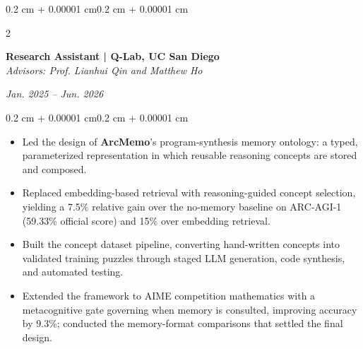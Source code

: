 \documentclass[10pt, letterpaper]{article}
\newenvironment{highlights}{
    \begin{itemize}[
        topsep=0.10 cm,
        parsep=0.10 cm,
        partopsep=0pt,
        itemsep=0pt,
        leftmargin=0.4 cm + 10pt
    ]
}{\end{itemize}}
\newenvironment{onecolentry}{
    \begin{adjustwidth}{0.2 cm + 0.00001 cm}{0.2 cm + 0.00001 cm}
}{\end{adjustwidth}}
\newenvironment{twocolentry}[2][]{
    \onecolentry
    \def\secondColumn{#2}
    \setcolumnwidth{\fill, 4.5 cm}
    \begin{paracol}{2}
}{
    \switchcolumn \raggedleft \secondColumn
    \end{paracol}
    \endonecolentry
}
\begin{document}
    \begin{twocolentry}{\textit{Jan. 2025 -- Jun. 2026}}
        \textbf{Research Assistant | Q-Lab, UC San Diego}\\
        \textit{Advisors: Prof. Lianhui Qin and Matthew Ho}
    \end{twocolentry}
    \vspace{0.10 cm}
    \begin{onecolentry}
        \begin{highlights}
            \item Led the design of \textbf{ArcMemo}'s program-synthesis memory ontology: a typed, parameterized representation in which reusable reasoning concepts are stored and composed.
            \item Replaced embedding-based retrieval with reasoning-guided concept selection, yielding a 7.5\% relative gain over the no-memory baseline on ARC-AGI-1 (59.33\% official score) and 15\% over embedding retrieval.
            \item Built the concept dataset pipeline, converting hand-written concepts into validated training puzzles through staged LLM generation, code synthesis, and automated testing.
            \item Extended the framework to AIME competition mathematics with a metacognitive gate governing when memory is consulted, improving accuracy by 9.3\%; conducted the memory-format comparisons that settled the final design.
        \end{highlights}
    \end{onecolentry}
    \vspace{0.20 cm}
\end{document}
